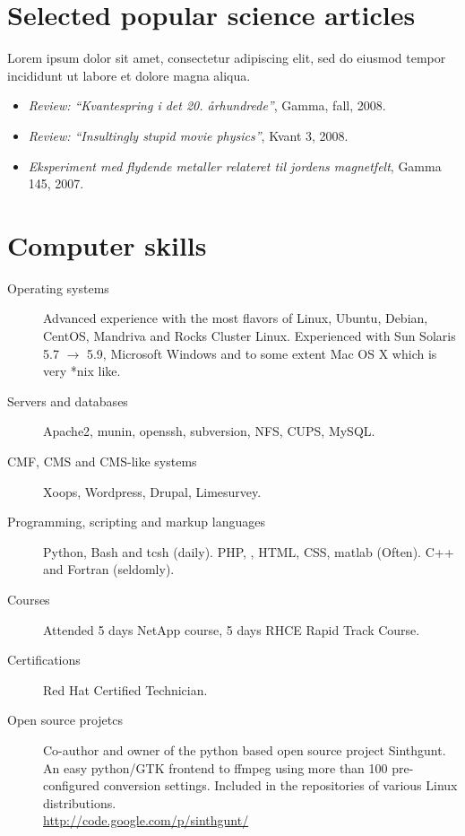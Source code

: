 \documentclass[margin, line, a4paper]{resume}
\begin{document}
\begin{resume}
\section{\mysidestyle Selected popular science articles}

Lorem ipsum dolor sit amet, consectetur adipiscing elit, sed do eiusmod tempor incididunt ut labore et dolore magna aliqua. 

\begin{itemize}
    \item \emph{Review: ``Kvantespring i det 20. århundrede''}, Gamma,
    fall, 2008.
    \item \emph{Review: ``Insultingly stupid movie physics''}, Kvant 3,
    2008.
    \item \emph{Eksperiment med flydende metaller relateret til jordens
    magnetfelt}, Gamma 145, 2007.
\end{itemize}

    
    

\section{\mysidestyle Computer skills}\vspace{1mm}
\begin{description}
    \item[Operating systems] Advanced experience with the most flavors of Linux, Ubuntu,
    Debian, CentOS, Mandriva and Rocks Cluster Linux. Experienced with Sun
    Solaris 5.7 $\rightarrow$ 5.9, Microsoft Windows and to some extent Mac OS
    X which is very *nix like.
    \item[Servers and databases] Apache2, munin, openssh, subversion, NFS, CUPS, MySQL.
    \item[CMF, CMS and CMS-like systems] Xoops, Wordpress, Drupal, Limesurvey.
    \item[Programming, scripting and markup languages] Python, Bash and
    tcsh (daily). PHP, \LaTeXe, HTML, CSS, matlab (Often). C++ and Fortran (seldomly).
    \item[Courses] Attended 5 days NetApp course, 5 days RHCE Rapid Track Course.  
    \item[Certifications] Red Hat Certified Technician.  
    \item[Open source projetcs] Co-author and owner of the python based open
    source project Sinthgunt.  An easy python/GTK frontend to ffmpeg using more
    than 100 pre-configured conversion settings. Included in the repositories
    of various Linux distributions.\\ \url{http://code.google.com/p/sinthgunt/}
\end{description}


\end{resume}
\end{document}
